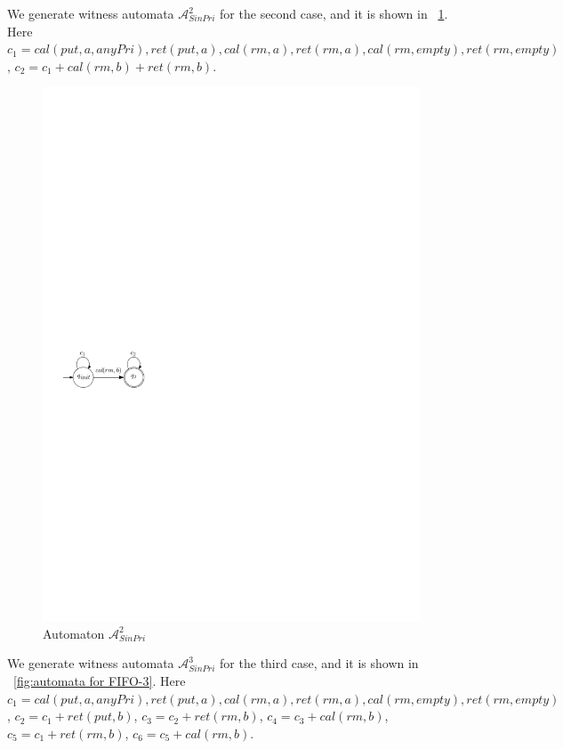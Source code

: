 We generate witness automata $\mathcal{A}_{\textit{SinPri}}^2$ for the second case, and it is shown in \figurename~\ref{fig:automata for FIFO-2}. Here $c_1 = \textit{cal}(\textit{put},a,\textit{anyPri}),\textit{ret}(\textit{put},a), \textit{cal}(\textit{rm},a),\textit{ret}(\textit{rm},a),\textit{cal}(\textit{rm},\textit{empty}),\textit{ret}(\textit{rm},\textit{empty})$, $c_2 = c_1 + \textit{cal}(\textit{rm},b) + \textit{ret}(\textit{rm},b)$.


\begin{figure}[htbp]
  \centering
  \includegraphics[width=0.3 \textwidth]{figures/PIC_AUTO_FIFO_2.pdf}
  \caption{Automaton $\mathcal{A}_{\textit{SinPri}}^2$}
  \label{fig:automata for FIFO-2}
\end{figure}

We generate witness automata $\mathcal{A}_{\textit{SinPri}}^3$ for the third case, and it is shown in \figurename~\ref{fig:automata for FIFO-3}. Here $c_1 = \textit{cal}(\textit{put},a,\textit{anyPri}),\textit{ret}(\textit{put},a), \textit{cal}(\textit{rm},a),\textit{ret}(\textit{rm},a),\textit{cal}(\textit{rm},\textit{empty}),\textit{ret}(\textit{rm},\textit{empty})$, $c_2 = c_1 + \textit{ret}(\textit{put},b)$, $c_3 = c_2 + \textit{ret}(\textit{rm},b)$, $c_4 = c_3 + \textit{cal}(\textit{rm},b)$, $c_5 = c_1 + \textit{ret}(\textit{rm},b)$, $c_6 = c_5 + \textit{cal}(\textit{rm},b)$.

